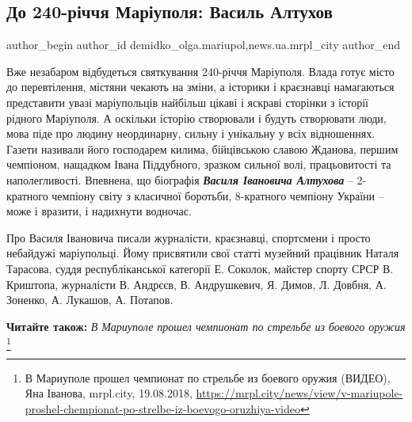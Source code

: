  
 
 
 
 
 
\subsection{До 240-річчя Маріуполя: Василь Алтухов}
\label{sec:20_08_2018.stz.news.ua.mrpl_city.1.240_ricchja_vasyl_altuhov}
 
\ifcmt
 author_begin
   author_id demidko_olga.mariupol,news.ua.mrpl_city
 author_end
\fi


Вже незабаром відбудеться святкування 240-річчя Маріуполя. Влада готує місто до
перевтілення, містяни чекають на зміни, а історики і краєзнавці намагаються
представити увазі маріупольців найбільш цікаві і яскраві сторінки з історії
рідного Маріуполя. А оскільки історію створювали і будуть створювати люди, мова
піде про людину неординарну, сильну і унікальну у всіх відношеннях. Газети
називали його господарем килима, бійцівською славою Жданова, першим чемпіоном,
нащадком Івана Піддубного, зразком сильної волі, працьовитості та
наполегливості. Впевнена, що біографія \emph{\textbf{Василя Івановича Алтухова}} – 2-кратного
чемпіону світу з класичної боротьби, 8-кратного чемпіону України – може і
вразити, і надихнути водночас.

Про Василя Івановича писали журналісти, краєзнавці, спортсмени і просто
небайдужі маріупольці. Йому присвятили свої статті музейний працівник Наталя
Тарасова, суддя республіканської категорії Е. Соколок, майстер спорту СРСР В.
Криштопа, журналісти В. Андрєєв, В. Андрушкевич, Я. Димов, Л. Довбня, А.
Зоненко, А. Лукашов, А. Потапов.

\textbf{Читайте також:} \emph{В Мариуполе прошел чемпионат по стрельбе из боевого оружия}%
\footnote{В Мариуполе прошел чемпионат по стрельбе из боевого оружия (ВИДЕО), Яна Іванова, mrpl.city, 19.08.2018, \url{https://mrpl.city/news/view/v-mariupole-proshel-chempionat-po-strelbe-iz-boevogo-oruzhiya-video}}

